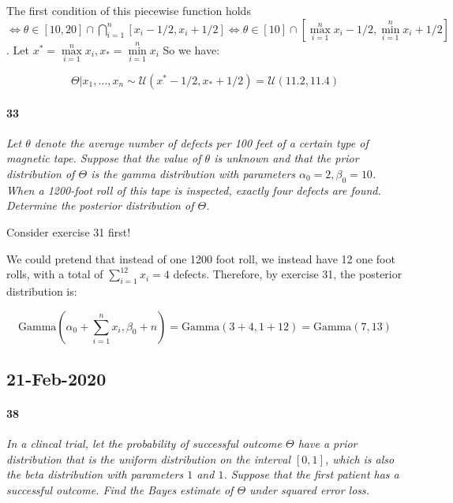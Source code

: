             The first condition of this piecewise function holds $\iff
            \theta \in [10, 20] \cap \bigcap\limits_{i=1}^n [x_i - 1/2, x_i
            + 1/2] \iff \theta \in [10] \cap [\max\limits_{i=1}^n x_i - 1/2,
            \min\limits_{i=1}^n x_i + 1/2]$. Let $x^* = \max\limits_{i=1}^n
            x_i, x_* = \min\limits_{i = 1}^n x_i$ So we have:

            \[
                \Theta | x_1, ..., x_n \sim \mathcal{U}(x^* - 1/2, x_* +
                1/2) = \mathcal{U}(11.2, 11.4)
            \]

        \paragraph{33}
        \textit{Let $\theta$ denote the average number of defects per 100
        feet of a certain type of magnetic tape. Suppose that the value of
        $\theta$ is unknown and that the prior distribution of $\Theta$ is
        the gamma distribution with parameters $\alpha_0 = 2, \beta_0 = 10$.
        When a 1200-foot roll of this tape is inspected, exactly four
        defects are found. Determine the posterior distribution of
        $\Theta$.}
            \begin{relq}
                Consider exercise 31 first!
            \end{relq}

            We could pretend that instead of one 1200 foot roll, we instead
            have 12 one foot rolls, with a total of $\sum\limits_{i=1}^{12}
            x_i = 4$ defects. Therefore, by exercise 31, the posterior
            distribution is:

            \[
                \text{Gamma}\left(\alpha_0 + \sum\limits_{i=1}^{n} x_i,
                \beta_0 + n\right) = \text{Gamma}(3 + 4, 1 + 12) =
                \text{Gamma}(7, 13)
            \]

    \subsection*{21-Feb-2020}
        \paragraph{38}
        \textit{In a clincal trial, let the probability of successful
        outcome $\Theta$ have a prior distribution that is the uniform
        distribution on the interval $[0, 1]$, which is also the beta
        distribution with parameters $1$ and $1$. Suppose that the first
        patient has a successful outcome. Find the Bayes estimate of
        $\Theta$ under squared error loss.}

